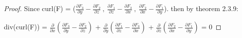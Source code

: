     \begin{proof}
        Since curl(F)
        = ($\frac{\partial F_3}{\partial y}-\frac{\partial F_2}{\partial z} \ , \
            \frac{\partial F_1}{\partial z}-\frac{\partial F_3}{\partial x} \ , \
            \frac{\partial F_2}{\partial x}-\frac{\partial F_1}{\partial y}$).
        then by {\color{red} theorem 2.3.9}:

        \hspace{0.5cm}
        div(curl(F))
        = $\frac{\partial}{\partial x}
            (\frac{\partial F_3}{\partial y}-\frac{\partial F_2}{\partial z})$
            + $\frac{\partial}{\partial y}
            (\frac{\partial F_1}{\partial z}-\frac{\partial F_3}{\partial x})$
            + $\frac{\partial}{\partial z}
            (\frac{\partial F_2}{\partial x}-\frac{\partial F_1}{\partial y})$
        = 0
    \end{proof}



























































